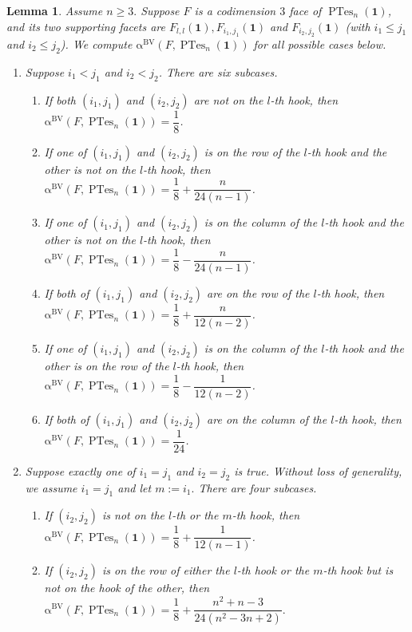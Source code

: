 \documentclass[12pt]{amsart}
\numberwithin{equation}{section}
\newtheorem{lem}[thm]{Lemma}
\theoremstyle{definition}
\def\ptes{\operatorname{PTes}}
\def\1{{\boldsymbol{1}}}
\def\bvalpha{\operatorname{\alpha^{BV}}}
\begin{document}
\begin{lem} \label{alphacd3}
  Assume $n \ge 3.$ Suppose $F$ is a codimension $3$ face of $\ptes_{n}(\boldsymbol{1})$, and its two supporting facets are $F_{l,l}(\1), F_{i_{1},j_{1}}(\1)$ and $F_{i_{2},j_{2}}(\1)$ (with $i_1 \le j_1$ and $i_2 \le j_2$). We compute $\bvalpha(F,\ptes_{n}(\boldsymbol{1}))$ for all possible cases below.
\begin{enumerate}[leftmargin=*, label={\rm (\arabic*)}]
    \item Suppose $i_{1} < j_{1}$ and $i_{2} < j_{2}$. There are six subcases.
    \begin{enumerate}[label={\rm (\roman*)}]
        \item If both $(i_{1},j_{1})$ and $(i_{2},j_{2})$ are not on the $l$-th hook, then $\bvalpha(F,\ptes_{n}(\boldsymbol{1}))=\dfrac{1}{8}$.
        \item If one of $(i_{1},j_{1})$ and $(i_{2},j_{2})$ is on the row of the $l$-th hook and the other is not on the $l$-th hook, then $\bvalpha(F,\ptes_{n}(\boldsymbol{1}))=\dfrac{1}{8} + \dfrac{n}{24(n-1)}$. 
	\item If one of $(i_{1},j_{1})$ and $(i_{2},j_{2})$ is on the column of the $l$-th hook and the other is not on the $l$-th hook, then $\bvalpha(F,\ptes_{n}(\boldsymbol{1}))=\dfrac{1}{8} - \dfrac{n}{24(n-1)}$.  
        \item If both of $(i_{1},j_{1})$ and $(i_{2},j_{2})$ are on the row of the $l$-th hook, then $\bvalpha(F,\ptes_{n}(\boldsymbol{1}))=\dfrac{1}{8} + \dfrac{n}{12(n-2)}$.
        \item If one of $(i_{1},j_{1})$ and $(i_{2},j_{2})$ is on the column of the $l$-th hook and the other is on the row of the $l$-th hook, then $\bvalpha(F,\ptes_{n}(\boldsymbol{1}))=\dfrac{1}{8} - \dfrac{1}{12(n-2)}$.
        \item If both of $(i_{1},j_{1})$ and $(i_{2},j_{2})$ are on the column of the $l$-th hook, then $\bvalpha(F,\ptes_{n}(\boldsymbol{1}))=\dfrac{1}{24}$.
    \end{enumerate}
    \item Suppose exactly one of $i_1=j_1$ and $i_2=j_2$ is true. Without loss of generality, we assume $i_1=j_1$ and let $m:=i_1.$ There are four subcases.
        \begin{enumerate}[label={\rm (\roman*)}]
		\item If $(i_{2},j_{2})$ is not on the $l$-th or the $m$-th hook, then $\bvalpha(F,\ptes_{n}(\boldsymbol{1}))=\dfrac{1}{8}+\dfrac{1}{12(n-1)}$.
            \item 
		   If $(i_{2},j_{2})$ is on the row of either the $l$-th hook or the $m$-th hook but is not on the hook of the other, 
		   then $\bvalpha(F,\ptes_{n}(\boldsymbol{1}))=\dfrac{1}{8}+\dfrac{n^{2}+n-3}{24(n^{2}-3n+2)}.$


\end{enumerate}
\end{enumerate}
\end{lem}
\end{document}
